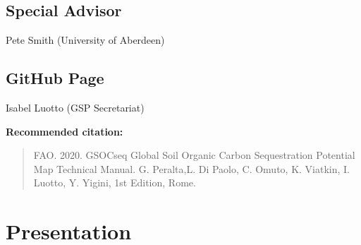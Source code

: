 \documentclass[
  10pt,
  b5paper,
]{book}
\begin{document}
\hypertarget{special-advisor}{%
\section*{Special Advisor}\label{special-advisor}}

Pete Smith (University of Aberdeen)

\hypertarget{github-page}{%
\section*{GitHub Page}\label{github-page}}

Isabel Luotto (GSP Secretariat)

\vfill

\textbf{Recommended citation:}

\begin{quote}
FAO. 2020. GSOCseq Global Soil Organic Carbon Sequestration Potential Map
Technical Manual. G. Peralta,L. Di Paolo, C. Omuto, K. Viatkin, I. Luotto, Y. Yigini, 1st Edition, Rome.
\end{quote}

\hypertarget{presentation}{%
\chapter{\textbar{} Presentation}\label{presentation}}
\end{document}
